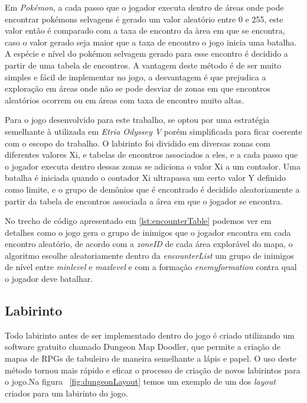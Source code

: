 \documentclass[
	12pt,				%
	openright,			%
	twoside,			%
	a4paper,			%
	english,			%
	french,				%
	spanish,			%
	brazil				%
	]{abntex2}
\begin{document}
Em \emph{Pokémon}, a cada passo que o jogador executa dentro de áreas onde pode encontrar pokémons selvagens é gerado um valor aleatório entre 0 e 255, este valor então é comparado com a taxa de encontro da àrea em que se encontra, caso o valor gerado seja maior que a taxa de encontro o jogo inicia uma batalha. A espécie e nível do pokémon selvagem gerado para esse encontro é decidido a partir de uma tabela de encontros. A vantagem deste método é de ser muito simples e fácil de implementar no jogo, a desvantagem é que prejudica a exploração em áreas onde não se pode desviar de zonas em que encontros aleatórios ocorrem ou em áreas com taxa de encontro muito altas.

Para o jogo desenvolvido para este trabalho, se optou por uma estratégia semelhante à utilizada em \emph{Etria Odyssey V} porém simplificada para ficar coerente com o escopo do trabalho. O labirinto foi dividido em diversas zonas com diferentes valores Xi, e tabelas de encontros associados a eles, e a cada passo que o jogador executa dentro dessas zonas se adiciona o valor Xi a um contador. Uma batalha é iniciada quando o contador Xi ultrapassa um certo valor Y definido como limite, e o grupo de demônios que é encontrado é decidido aleatoriamente a partir da tabela de encontros associada a área em que o jogador se encontra.
\pagebreak


No trecho de código apresentado em \ref{lst:encounterTable} podemos ver em detalhes como o jogo gera o grupo de inimigos que o jogador encontra em cada encontro aleatório, de acordo com a \emph{zoneID} de cada área explorável do mapa, o algoritmo escolhe aleatoriamente dentro da \emph{encounterList} um grupo de inimigos de nível entre \emph{min\textunderscore level} e \emph{max\textunderscore level} e com a formação \emph{enemy\textunderscore formation} contra qual o jogador deve batalhar.

\subsection{Labirinto}

	Todo labirinto antes de ser implementado dentro do jogo é criado utilizando um software gratuito chamado Dungeon Map Doodler, que permite a criação de mapas de RPGs de tabuleiro de maneira semelhante a lápis e papel. O uso deste método tornou mais rápido e eficaz o processo de criação de novos labirintos para o jogo.Na figura ~\ref{fig:dungeonLayout} temos um exemplo de um dos \emph{layout} criados para um labirinto do jogo.
	
\end{document}
